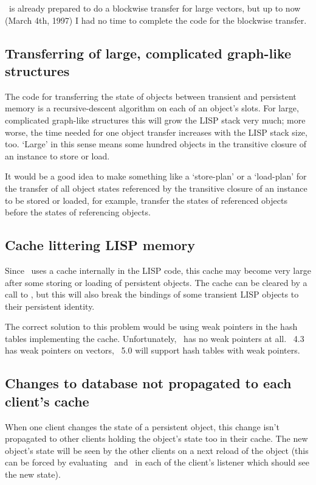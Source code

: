 \plob\ is already prepared to do a blockwise transfer for
large vectors, but up to now (March 4th, 1997) I had no time to
complete the code for the blockwise transfer.

\subsection{Transferring of large, complicated graph-like structures}

The code for transferring the state of objects between
transient and persistent memory is a recursive-descent algorithm on
each of an object's slots. For large, complicated graph-like
structures this will grow the LISP stack very much; more worse, the
time needed for one object transfer increases with the LISP stack
size, too. `Large' in this sense means some hundred objects in the
transitive closure of an instance to store or load.

It would be a good idea to make something like a `store-plan' or a
`load-plan' for the transfer of all object states referenced by the
transitive closure of an instance to be stored or loaded, for example,
transfer the states of referenced objects before the states of
referencing objects.

\subsection{Cache littering LISP memory}%
\label{sec:CacheLitteringMemory}

Since \plob\ uses a cache internally in the LISP code, this cache may
become very large after some storing or loading of persistent objects.
The cache can be cleared by a call to , but this
will also break the bindings of some transient LISP objects to their
persistent identity.

The correct solution to this problem would be using weak pointers in
the hash tables implementing the cache. Unfortunately, \lwcl\ has no
weak pointers at all. \allegrocl\ 4.3 has weak pointers on vectors,
\allegrocl\ 5.0 will support hash tables with weak pointers.

\subsection{Changes to database not propagated to each client's cache}

When one client changes the state of a persistent object, this change
isn't propagated to other clients holding the object's state too in
their cache. The new object's state will be seen by the other
clients on a next reload of the object (this can be forced by
evaluating \ and \ in each of the client's listener which should see the
new state).

